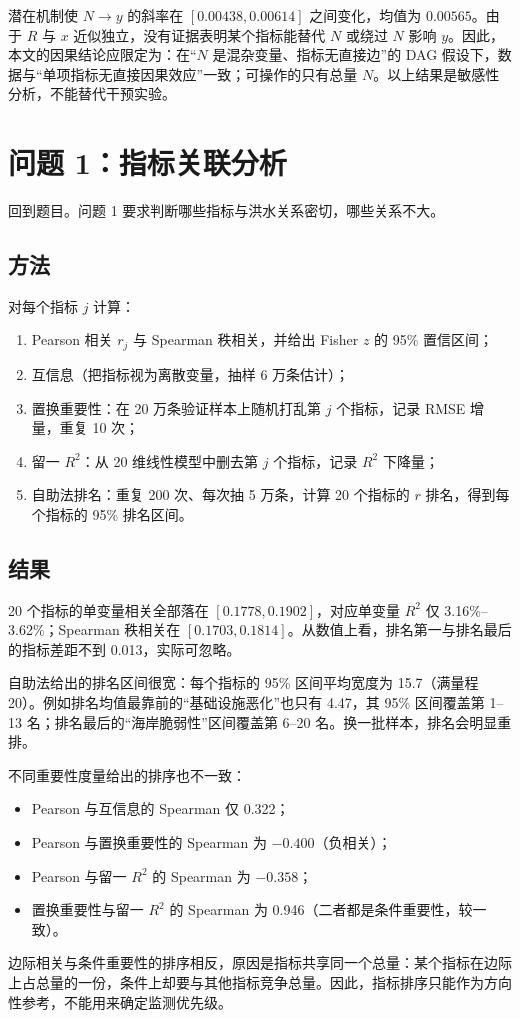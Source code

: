 \documentclass[12pt,a4paper]{ctexart}
\begin{document}
潜在机制使 \(N\to y\) 的斜率在 \([0.00438,0.00614]\) 之间变化，均值为 \(0.00565\)。由于 \(R\) 与 \(x\) 近似独立，没有证据表明某个指标能替代 \(N\) 或绕过 \(N\) 影响 \(y\)。因此，本文的因果结论应限定为：在“\(N\) 是混杂变量、指标无直接边”的 DAG 假设下，数据与“单项指标无直接因果效应”一致；可操作的只有总量 \(N\)。以上结果是敏感性分析，不能替代干预实验。

\section{问题 1：指标关联分析}

回到题目。问题 1 要求判断哪些指标与洪水关系密切，哪些关系不大。

\subsection{方法}
对每个指标 $j$ 计算：
\begin{enumerate}
  \item Pearson 相关 $r_j$ 与 Spearman 秩相关，并给出 Fisher $z$ 的 95\% 置信区间；
  \item 互信息（把指标视为离散变量，抽样 6 万条估计）；
  \item 置换重要性：在 20 万条验证样本上随机打乱第 $j$ 个指标，记录 RMSE 增量，重复 10 次；
  \item 留一 $R^2$：从 20 维线性模型中删去第 $j$ 个指标，记录 $R^2$ 下降量；
  \item 自助法排名：重复 200 次、每次抽 5 万条，计算 20 个指标的 $r$ 排名，得到每个指标的 95\% 排名区间。
\end{enumerate}

\subsection{结果}
20 个指标的单变量相关全部落在 $[0.1778,0.1902]$，对应单变量 $R^2$ 仅 3.16\%–3.62\%；Spearman 秩相关在 $[0.1703,0.1814]$。从数值上看，排名第一与排名最后的指标差距不到 0.013，实际可忽略。

自助法给出的排名区间很宽：每个指标的 95\% 区间平均宽度为 15.7（满量程 20）。例如排名均值最靠前的“基础设施恶化”也只有 4.47，其 95\% 区间覆盖第 1–13 名；排名最后的“海岸脆弱性”区间覆盖第 6–20 名。换一批样本，排名会明显重排。

不同重要性度量给出的排序也不一致：
\begin{itemize}
  \item Pearson 与互信息的 Spearman 仅 0.322；
  \item Pearson 与置换重要性的 Spearman 为 $-0.400$（负相关）；
  \item Pearson 与留一 $R^2$ 的 Spearman 为 $-0.358$；
  \item 置换重要性与留一 $R^2$ 的 Spearman 为 0.946（二者都是条件重要性，较一致）。
\end{itemize}
边际相关与条件重要性的排序相反，原因是指标共享同一个总量：某个指标在边际上占总量的一份，条件上却要与其他指标竞争总量。因此，指标排序只能作为方向性参考，不能用来确定监测优先级。
\end{document}
